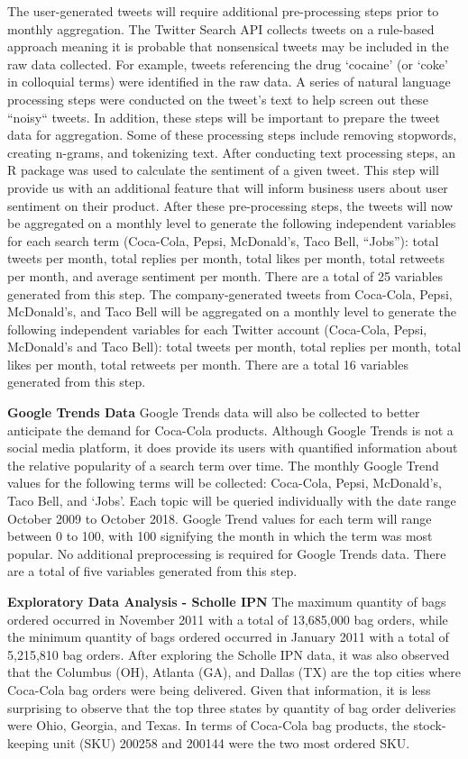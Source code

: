 \documentclass[12pt,oneside]{chicagocapstone}
\begin{document}
The user-generated tweets will require additional pre-processing steps
prior to monthly aggregation. The Twitter Search API collects tweets on
a rule-based approach meaning it is probable that nonsensical tweets may
be included in the raw data collected. For example, tweets referencing
the drug `cocaine' (or `coke' in colloquial terms) were identified in
the raw data. A series of natural language processing steps were
conducted on the tweet's text to help screen out these ``noisy`` tweets.
In addition, these steps will be important to prepare the tweet data for
aggregation. Some of these processing steps include removing stopwords,
creating n-grams, and tokenizing text. After conducting text processing
steps, an R package was used to calculate the sentiment of a given
tweet. This step will provide us with an additional feature that will
inform business users about user sentiment on their product. After these
pre-processing steps, the tweets will now be aggregated on a monthly
level to generate the following independent variables for each search
term (Coca-Cola, Pepsi, McDonald's, Taco Bell, ``Jobs''): total tweets
per month, total replies per month, total likes per month, total
retweets per month, and average sentiment per month. There are a total
of 25 variables generated from this step. The company-generated tweets
from Coca-Cola, Pepsi, McDonald's, and Taco Bell will be aggregated on a
monthly level to generate the following independent variables for each
Twitter account (Coca-Cola, Pepsi, McDonald's and Taco Bell): total
tweets per month, total replies per month, total likes per month, total
retweets per month. There are a total 16 variables generated from this
step.

\textbf{Google Trends Data} Google Trends data will also be collected to
better anticipate the demand for Coca-Cola products. Although Google
Trends is not a social media platform, it does provide its users with
quantified information about the relative popularity of a search term
over time. The monthly Google Trend values for the following terms will
be collected: Coca-Cola, Pepsi, McDonald's, Taco Bell, and `Jobs'. Each
topic will be queried individually with the date range October 2009 to
October 2018. Google Trend values for each term will range between 0 to
100, with 100 signifying the month in which the term was most popular.
No additional preprocessing is required for Google Trends data. There
are a total of five variables generated from this step.

\textbf{Exploratory Data Analysis - Scholle IPN} The maximum quantity of
bags ordered occurred in November 2011 with a total of 13,685,000 bag
orders, while the minimum quantity of bags ordered occurred in January
2011 with a total of 5,215,810 bag orders. After exploring the Scholle
IPN data, it was also observed that the Columbus (OH), Atlanta (GA), and
Dallas (TX) are the top cities where Coca-Cola bag orders were being
delivered. Given that information, it is less surprising to observe that
the top three states by quantity of bag order deliveries were Ohio,
Georgia, and Texas. In terms of Coca-Cola bag products, the
stock-keeping unit (SKU) 200258 and 200144 were the two most ordered
SKU.
\end{document}
